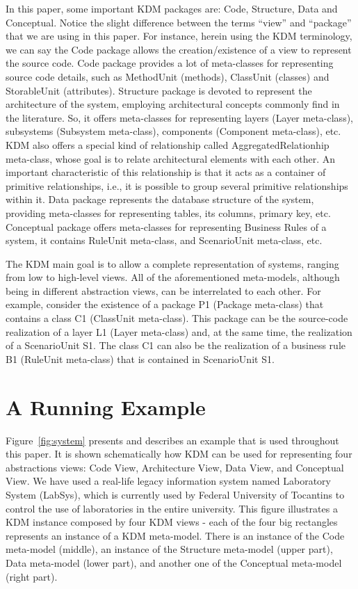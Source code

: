 In this paper, some important KDM packages are: Code, Structure, Data and Conceptual. Notice the slight difference between the terms ``view'' and ``package'' that we are using in this paper. For instance, herein using the KDM terminology, we can say the Code package allows the creation/existence of a view to represent the source code. Code package provides a lot of meta-classes for representing source code details, such as MethodUnit (methods), ClassUnit (classes) and StorableUnit (attributes). Structure package is devoted to represent the architecture of the system, employing architectural concepts commonly find in the literature. So, it offers meta-classes for representing layers (Layer meta-class), subsystems (Subsystem meta-class), components (Component meta-class), etc. KDM also offers a special kind of relationship called AggregatedRelationhip meta-class, whose goal is to relate architectural elements with each other. An important characteristic of this relationship is that it acts as a container of primitive relationships, i.e., it is possible to group several primitive relationships within it. Data package represents the database structure of the system, providing meta-classes for representing tables, its columns, primary key, etc. Conceptual package offers meta-classes for representing Business Rules of a system, it contains RuleUnit meta-class, and ScenarioUnit meta-class, etc. 

The KDM main goal is to allow a complete representation of systems, ranging from low to high-level views. All of the aforementioned meta-models, although being in different abstraction views, can be interrelated to each other. For example, consider the existence of a package P1 (Package meta-class) that contains a class C1 (ClassUnit meta-class). This package can be the source-code realization of a layer L1 (Layer meta-class) and, at the same time, the realization of a ScenarioUnit S1. The class C1 can also be the realization of a business rule B1 (RuleUnit meta-class) that is contained in ScenarioUnit S1. 

\section{A Running Example}\label{sec:running_example}

Figure~\ref{fig:system} presents and describes an example that is used throughout this paper. It is shown schematically how KDM can be used for representing four abstractions views: Code View, Architecture View, Data View, and Conceptual View. We have used a real-life legacy information system named Laboratory System (LabSys), which is currently used by Federal University of Tocantins to control the use of laboratories in the entire university. This figure illustrates a KDM instance composed by four KDM views - each of the four big rectangles represents an instance of a KDM meta-model. There is an instance of the Code meta-model (middle), an instance of the Structure meta-model (upper part), Data meta-model (lower part), and another one of the Conceptual meta-model (right part). 


